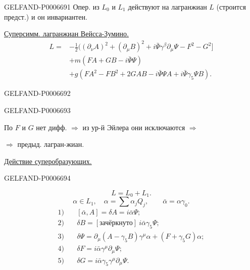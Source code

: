 \begin{GelfandAdjacentEvidence}{GELFAND-P000669}{1}
Опер. из \(L_0\) и \(L_1\) действуют на лагранжиан \(L\) (строится предст.)
и он инвариантен.

\underline{Суперсимм. лагранжиан Вейсса-Зумино.}
\[
\begin{aligned}
L={}&-\tfrac12\bigl((\partial_\nu A)^2+(\partial_\mu B)^2
+i\bar\Psi\gamma^\beta\partial_\mu\Psi-F^2-G^2\bigr]\\
&+m(FA+GB-i\bar\Psi\Psi)\\
&+g(FA^2-FB^2+2GAB-i\bar\Psi\Psi A+i\bar\Psi\gamma_5\Psi B).
\end{aligned}
\]
\end{GelfandAdjacentEvidence}
\begin{GelfandAdjacentEvidence}{GELFAND-P000669}{2}

\end{GelfandAdjacentEvidence}
\begin{GelfandAdjacentEvidence}{GELFAND-P000669}{3}


По \(F\) и \(G\) нет дифф. \(\Rightarrow\) из ур-й Эйлера они исключаются \(\Rightarrow\)

\(\Rightarrow\) предыд. лагран-жиан.

\underline{Действие суперобразующих.}
\end{GelfandAdjacentEvidence}
\begin{GelfandAdjacentEvidence}{GELFAND-P000669}{4}

\[
L=L_0+L_1.
\]
\[
\alpha\in L_1,\quad\alpha=\sum\alpha_jQ_j,\qquad\bar\alpha=\alpha\gamma_0.
\]
\[
\begin{aligned}
1)\quad&[\bar\alpha,A]=\delta A=i\bar\alpha\Psi;\\
2)\quad&\delta B=[\text{зачёркнуто}]\ i\bar\alpha\gamma_5\Psi;\\
3)\quad&\delta\Psi=\partial_\mu(A-\gamma_5B)\gamma^\mu\alpha+(F+\gamma_5G)\alpha;\\
4)\quad&\delta F=i\bar\alpha\gamma^\mu\partial_\mu\Psi;\\
5)\quad&\delta G=i\bar\alpha\gamma_5\gamma^\mu\partial_\mu\Psi.
\end{aligned}
\]
\end{GelfandAdjacentEvidence}
